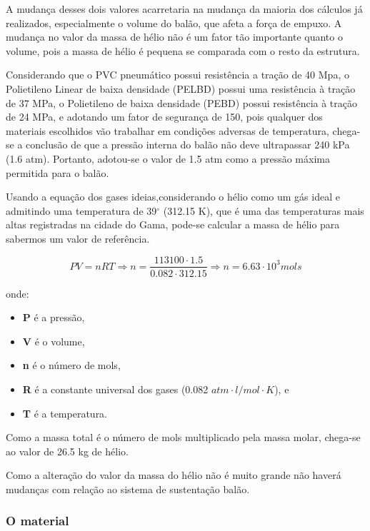 A mudança desses dois valores acarretaria na mudança da maioria dos cálculos já realizados, especialmente o volume do balão, que afeta a força de empuxo. A mudança no valor da massa de hélio não é um fator tão importante quanto o volume, pois a massa de hélio é pequena se comparada com o resto da estrutura.

Considerando que o PVC pneumático possui resistência a tração de 40 Mpa, o Polietileno Linear de baixa densidade (PELBD) possui uma resistência à tração de 37 MPa, o Polietileno de baixa densidade (PEBD) possui resistência à tração de 24 MPa, e adotando um fator de segurança de 150, pois qualquer dos materiais escolhidos vão trabalhar em condições adversas de temperatura, chega-se a conclusão de que a pressão interna do balão não deve ultrapassar 240 kPa (1.6 atm). Portanto, adotou-se o valor de 1.5 atm como a pressão máxima permitida para o balão.

Usando a equação dos gases ideias,considerando o hélio como um gás ideal e admitindo uma temperatura de 39$^{\circ}$ (312.15 K), que é uma das temperaturas mais altas registradas na cidade do Gama,  pode-se calcular a massa de hélio para sabermos um valor de referência.

\begin{equation}
	PV = nRT \Rightarrow n =  \frac{113100\cdot1.5}{0.082\cdot312.15} \Rightarrow n = 6.63\cdot10^3 mols
	\label{gasideal}
\end{equation}

onde:

\begin{itemize}
	\item \textbf{P} é a pressão,
	\item \textbf{V} é o volume,
	\item \textbf{n} é o número de mols,
	\item \textbf{R} é a constante universal dos gases (0.082 $atm\cdot l/mol\cdot K$), e
	\item \textbf{T} é a temperatura.
\end{itemize}

Como a massa total é o número de mols multiplicado pela massa molar, chega-se ao valor de 26.5 kg de hélio.

Como a alteração do valor da massa do hélio não é muito grande não haverá mudanças com relação ao sistema de sustentação balão.

\subsubsection{O material}


